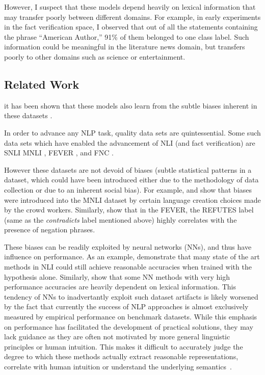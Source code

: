 \documentclass[compsoc,onecolumn]{IEEEtran}
\begin{document}
However, I suspect that these models depend heavily on lexical information that may transfer poorly between different domains. For example, in early experiments in the fact verification space, I observed that out of all the statements containing the phrase ``American Author,'' 91\% of them belonged to one class label. Such information could be meaningful in the literature news domain, but transfers poorly to other domains such as science or entertainment. 



\subsection{Related Work}

it has been shown that these models also learn from the subtle biases inherent in these datasets \citep*{gururangan2018annotation}.



In order to advance any NLP task, quality data sets are quintessential. Some such data sets which have enabled the advancement of NLI (and fact verification) are SNLI \citep*{bowman2015large} MNLI \citep*{williams2017broad}, FEVER \citep*{thorne2018fever}, and FNC \citep*{pomerleau2017fake}.

However these datasets are not devoid of biases (subtle statistical patterns in a dataset, which could have been introduced either due to the methodology of data collection or due to an inherent social bias). 
For example, \citep*{gururangan2018annotation} and \citep*{poliak2018hypothesis} show that biases were introduced into the MNLI dataset by certain language creation choices made by the crowd workers. Similarly, \citep*{schuster2019towards} show that in the FEVER, the REFUTES label (same as the \textit{contradicts} label mentioned above) highly correlates with the presence of negation phrases. 

These biases can be readily exploited by neural networks (NNs), and thus have influence on performance.  As an example, \citep*{gururangan2018annotation} demonstrate that many state of the art methods in NLI could still achieve reasonable accuracies when trained with the hypothesis alone. Similarly, \citep*{emnlp2019sandeep} show that some NN methods with very high performance accuracies are heavily dependent on lexical information. This tendency of NNs to inadvertantly exploit such dataset artifacts is likely worsened by the fact that currently the success of NLP approaches is almost exclusively measured by empirical performance on benchmark datasets. While this emphasis on performance has facilitated the development of practical solutions, they may lack guidance as they are often not motivated by more general linguistic principles or human intuition. This makes it difficult to accurately judge the degree to which these methods actually extract reasonable representations, correlate with  human intuition or understand the underlying semantics~\citep*{dagan2013recognizing}.
\end{document}
